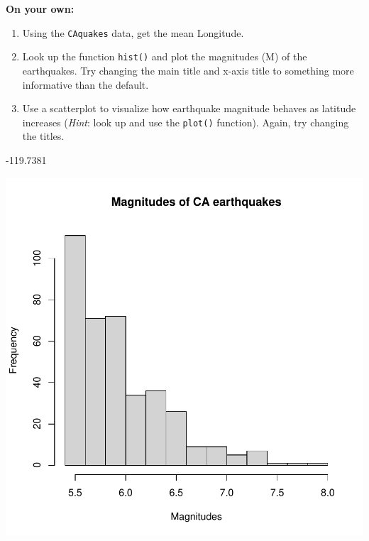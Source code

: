 \documentclass[answers]{exam}
\begin{document}
\noindent\textbf{On your own:}

\begin{enumerate}

\item Using the \texttt{CAquakes} data, get the mean Longitude.
\item Look up the function \texttt{hist()} and plot the magnitudes (M) of the earthquakes. Try changing the main title and x-axis title to something more informative than the default.
\item Use a scatterplot to visualize how earthquake magnitude behaves as latitude increases (\textit{Hint}: look up and use the \texttt{plot()} function). Again, try changing the titles.
\end{enumerate}

\begin{solution}
\begin{Schunk}
\begin{Soutput}
[1] -119.7381
\end{Soutput}
\end{Schunk}

\begin{Schunk}
\end{Schunk}
\includegraphics{RLab0_answers-038}


\end{solution}
\end{document}
